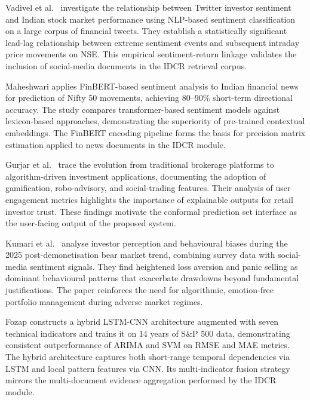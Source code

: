 \documentclass[12pt,a4paper,oneside]{report}
\theoremstyle{definition}
\theoremstyle{remark}
\begin{document}
\medskip

\noindent Vadivel et al.\ \cite{Vadivel2025TwitterSentiment} investigate the relationship between Twitter investor sentiment and Indian stock market performance using NLP-based sentiment classification on a large corpus of financial tweets. They establish a statistically significant lead-lag relationship between extreme sentiment events and subsequent intraday price movements on NSE. This empirical sentiment-return linkage validates the inclusion of social-media documents in the IDCR retrieval corpus.

\medskip

\noindent Maheshwari \cite{Maheshwari2025NewsSentiment} applies FinBERT-based sentiment analysis to Indian financial news for prediction of Nifty 50 movements, achieving 80--90\% short-term directional accuracy. The study compares transformer-based sentiment models against lexicon-based approaches, demonstrating the superiority of pre-trained contextual embeddings. The FinBERT encoding pipeline forms the basis for precision matrix estimation applied to news documents in the IDCR module.

\medskip

\noindent Gurjar et al.\ \cite{Gurjar2024InvestmentApps} trace the evolution from traditional brokerage platforms to algorithm-driven investment applications, documenting the adoption of gamification, robo-advisory, and social-trading features. Their analysis of user engagement metrics highlights the importance of explainable outputs for retail investor trust. These findings motivate the conformal prediction set interface as the user-facing output of the proposed system.

\medskip

\noindent Kumari et al.\ \cite{Kumari2025BearTrendBiases} analyse investor perception and behavioural biases during the 2025 post-demonetisation bear market trend, combining survey data with social-media sentiment signals. They find heightened loss aversion and panic selling as dominant behavioural patterns that exacerbate drawdowns beyond fundamental justifications. The paper reinforces the need for algorithmic, emotion-free portfolio management during adverse market regimes.

\noindent Fozap \cite{Fozap2025HybridLSTMCNN} constructs a hybrid LSTM-CNN architecture augmented with seven technical indicators and trains it on 14 years of S\&P 500 data, demonstrating consistent outperformance of ARIMA and SVM on RMSE and MAE metrics. The hybrid architecture captures both short-range temporal dependencies via LSTM and local pattern features via CNN. Its multi-indicator fusion strategy mirrors the multi-document evidence aggregation performed by the IDCR module.
\end{document}

